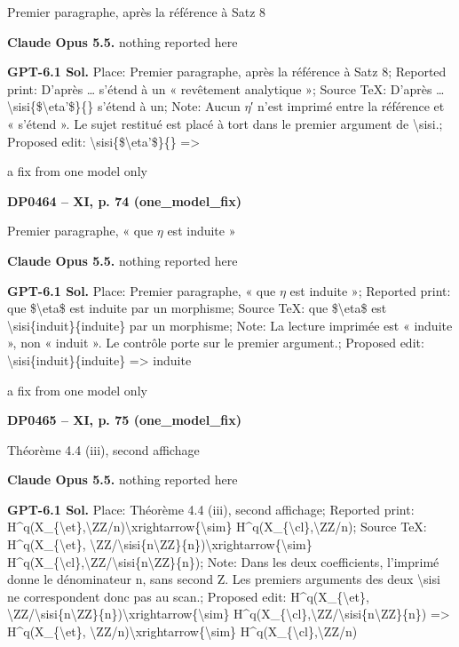 Premier paragraphe, après la référence à Satz 8\par
\textbf{Claude Opus 5.5.} nothing reported here\par
\textbf{GPT-6.1 Sol.} Place: Premier paragraphe, après la référence à Satz 8; Reported print: D'après … s'étend à un « revêtement analytique »; Source TeX: D'après … \textbackslash{}sisi\{\$\textbackslash{}eta'\$\}\{\} s'étend à un; Note: Aucun \ensuremath{\eta}′ n'est imprimé entre la référence et « s'étend ». Le sujet restitué est placé à tort dans le premier argument de \textbackslash{}sisi.; Proposed edit: \textbackslash{}sisi\{\$\textbackslash{}eta'\$\}\{\} =\allowbreak > \par
a fix from one model only\par
\par\noindent\hypertarget{DP0464}{}\textbf{DP0464 -- XI, p. 74 (one\_model\_fix)}\par
Premier paragraphe, « que \ensuremath{\eta} est induite »\par
\textbf{Claude Opus 5.5.} nothing reported here\par
\textbf{GPT-6.1 Sol.} Place: Premier paragraphe, « que \ensuremath{\eta} est induite »; Reported print: que \$\textbackslash{}eta\$ est induite par un morphisme; Source TeX: que \$\textbackslash{}eta\$ est \textbackslash{}sisi\{induit\}\{induite\} par un morphisme; Note: La lecture imprimée est « induite », non « induit ». Le contrôle porte sur le premier argument.; Proposed edit: \textbackslash{}sisi\{induit\}\{induite\} =\allowbreak > induite\par
a fix from one model only\par
\par\noindent\hypertarget{DP0465}{}\textbf{DP0465 -- XI, p. 75 (one\_model\_fix)}\par
Théorème 4.4 (iii), second affichage\par
\textbf{Claude Opus 5.5.} nothing reported here\par
\textbf{GPT-6.1 Sol.} Place: Théorème 4.4 (iii), second affichage; Reported print: H\textasciicircum{}q(X\_\{\textbackslash{}et\},\textbackslash{}ZZ/n)\textbackslash{}xrightarrow\{\textbackslash{}sim\} H\textasciicircum{}q(X\_\{\textbackslash{}cl\},\textbackslash{}ZZ/n); Source TeX: H\textasciicircum{}q(X\_\{\textbackslash{}et\}, \textbackslash{}ZZ/\textbackslash{}sisi\{n\textbackslash{}ZZ\}\{n\})\textbackslash{}xrightarrow\{\textbackslash{}sim\} H\textasciicircum{}q(X\_\{\textbackslash{}cl\},\textbackslash{}ZZ/\textbackslash{}sisi\{n\textbackslash{}ZZ\}\{n\}); Note: Dans les deux coefficients, l'imprimé donne le dénominateur n, sans second Z. Les premiers arguments des deux \textbackslash{}sisi ne correspondent donc pas au scan.; Proposed edit: H\textasciicircum{}q(X\_\{\textbackslash{}et\}, \textbackslash{}ZZ/\textbackslash{}sisi\{n\textbackslash{}ZZ\}\{n\})\textbackslash{}xrightarrow\{\textbackslash{}sim\} H\textasciicircum{}q(X\_\{\textbackslash{}cl\},\textbackslash{}ZZ/\textbackslash{}sisi\{n\textbackslash{}ZZ\}\{n\}) =\allowbreak > H\textasciicircum{}q(X\_\{\textbackslash{}et\}, \textbackslash{}ZZ/n)\textbackslash{}xrightarrow\{\textbackslash{}sim\} H\textasciicircum{}q(X\_\{\textbackslash{}cl\},\textbackslash{}ZZ/n)\par
